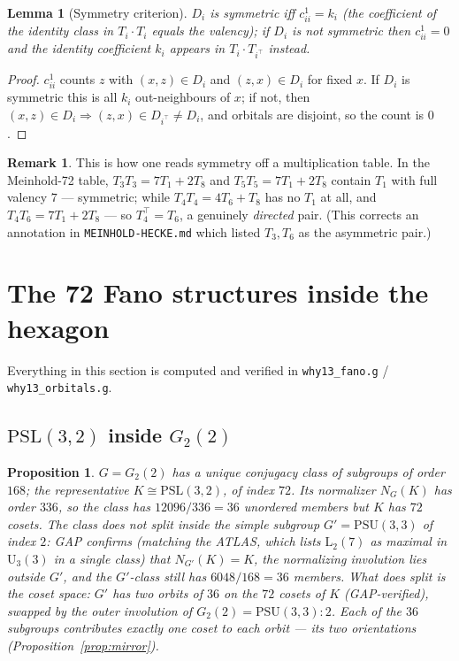 \documentclass[11pt]{article}
\newtheorem{lemma}[theorem]{Lemma}
\newtheorem{proposition}[theorem]{Proposition}
\theoremstyle{definition}
\newtheorem{remark}[theorem]{Remark}
\newcommand{\PSL}{\mathrm{PSL}}
\newcommand{\PSU}{\mathrm{PSU}}
\begin{document}
\begin{lemma}[Symmetry criterion]\label{lem:symcrit}
$D_i$ is symmetric iff $c_{ii}^1 = k_i$ (the coefficient of the identity
class in $T_i\cdot T_i$ equals the valency); if $D_i$ is not symmetric then
$c_{ii}^1 = 0$ and the identity coefficient $k_i$ appears in
$T_i \cdot T_{i^\top}$ instead.
\end{lemma}

\begin{proof}
$c_{ii}^1$ counts $z$ with $(x,z) \in D_i$ and $(z,x)\in D_i$ for fixed $x$.
If $D_i$ is symmetric this is all $k_i$ out-neighbours of $x$; if not, then
$(x,z)\in D_i \Rightarrow (z,x) \in D_{i^\top} \neq D_i$, and orbitals are
disjoint, so the count is $0$.
\end{proof}

\begin{remark}
This is how one reads symmetry off a multiplication table. In the
Meinhold-72 table, $T_3 T_3 = 7T_1 + 2T_8$ and $T_5T_5 = 7T_1 + 2T_8$
contain $T_1$ with full valency $7$ --- symmetric; while
$T_4 T_4 = 4T_6 + T_8$ has no $T_1$ at all, and
$T_4 T_6 = 7T_1 + 2T_8$ --- so $T_4^\top = T_6$, a genuinely
\emph{directed} pair. (This corrects an annotation in
\texttt{MEINHOLD-HECKE.md} which listed $T_3,T_6$ as the asymmetric pair.)
\end{remark}

\section{The 72 Fano structures inside the hexagon}\label{sec:72}

Everything in this section is computed and verified in
\texttt{why13\_fano.g} / \texttt{why13\_orbitals.g}.

\subsection{$\PSL(3,2)$ inside $G_2(2)$}

\begin{proposition}\label{prop:K}
$G = G_2(2)$ has a unique conjugacy class of subgroups of order $168$;
the representative $K \cong \PSL(3,2)$, of index $72$. Its normalizer
$N_G(K)$ has order $336$, so the class has $12096/336 = 36$
\emph{unordered} members but $K$ has $72$ cosets. The class does
\emph{not} split inside the simple subgroup $G' = \PSU(3,3)$ of index $2$:
GAP confirms (matching the ATLAS, which lists $\mathrm L_2(7)$ as maximal
in $\mathrm U_3(3)$ in a single class) that $N_{G'}(K) = K$, the
normalizing involution lies \emph{outside} $G'$, and the $G'$-class still
has $6048/168 = 36$ members. What \emph{does} split is the coset space:
$G'$ has two orbits of $36$ on the $72$ cosets of $K$ (GAP-verified),
swapped by the outer involution of $G_2(2) = \PSU(3,3){:}2$. Each of the
$36$ subgroups contributes exactly one coset to each orbit --- its two
orientations (Proposition~\ref{prop:mirror}).
\end{proposition}
\end{document}
